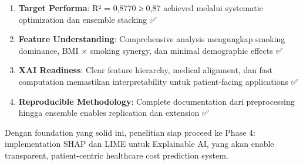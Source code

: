 \begin{enumerate}
    \item \textbf{Target Performa}: R² = 0,8770 ≥ 0,87 achieved melalui systematic optimization dan ensemble stacking ✅

    \item \textbf{Feature Understanding}: Comprehensive analysis mengungkap smoking dominance, BMI × smoking synergy, dan minimal demographic effects ✅

    \item \textbf{XAI Readiness}: Clear feature hierarchy, medical alignment, dan fast computation memastikan interpretability untuk patient-facing applications ✅

    \item \textbf{Reproducible Methodology}: Complete documentation dari preprocessing hingga ensemble enables replication dan extension ✅
\end{enumerate}

Dengan foundation yang solid ini, penelitian siap proceed ke Phase 4: implementation SHAP dan LIME untuk Explainable AI, yang akan enable transparent, patient-centric healthcare cost prediction system.


